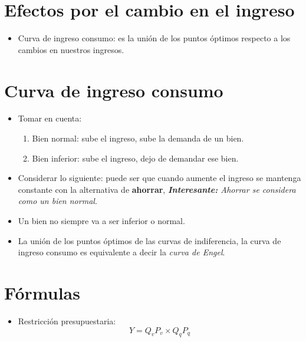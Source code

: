 
\section{Efectos por el cambio en el ingreso}
\begin{itemize}
    \item Curva de ingreso consumo: es la unión de los puntos óptimos respecto a los cambios en nuestros ingresos.
\end{itemize}



\section{Curva de ingreso consumo}
\begin{itemize}
    \item Tomar en cuenta:
        \begin{enumerate}
            \item Bien normal: sube el ingreso, sube la demanda de un bien.
            \item Bien inferior: sube el ingreso, dejo de demandar ese bien.
        \end{enumerate}
    
    \item Considerar lo siguiente: puede ser que cuando aumente el ingreso se mantenga constante con la alternativa de \textbf{ahorrar}, \emph{\textbf{Interesante:} Ahorrar se considera como un bien normal}.
    \item Un bien no siempre va a ser inferior o normal.
    \item La unión de los puntos óptimos de las curvas de indiferencia, la curva de ingreso consumo es equivalente a decir la \emph{curva de Engel}.
\end{itemize}


\section{Fórmulas}
\begin{itemize}
    \item Restricción presupuestaria:
        \[
          Y = Q_vP_v \times Q_qP_q
        \]
\end{itemize}






